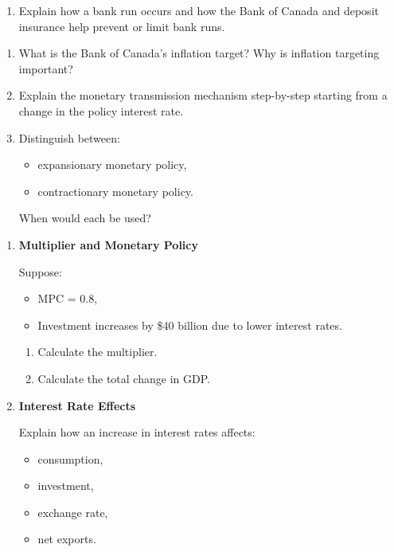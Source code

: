 \documentclass[12pt]{article}
\begin{document}
\begin{enumerate}[label=\textbf{\arabic*.}, start=6]

\item Explain how a bank run occurs and how the Bank of Canada and deposit insurance help prevent or limit bank runs.

\end{enumerate}


\vspace{1em}




\begin{enumerate}[label=\textbf{\arabic*.}, start=7]

\item What is the Bank of Canada’s inflation target? 
Why is inflation targeting important?

\item Explain the monetary transmission mechanism step-by-step starting from a change in the policy interest rate.

\item Distinguish between:
\begin{itemize}
    \item expansionary monetary policy,
    \item contractionary monetary policy.
\end{itemize}
When would each be used?

\end{enumerate}



\begin{enumerate}[label=\textbf{\arabic*.}, start=10]

\item \textbf{Multiplier and Monetary Policy}

Suppose:
\begin{itemize}
    \item MPC = 0.8,
    \item Investment increases by \$40 billion due to lower interest rates.
\end{itemize}

\begin{enumerate}
    \item[(a)] Calculate the multiplier.
    \item[(b)] Calculate the total change in GDP.
\end{enumerate}

\item \textbf{Interest Rate Effects}

Explain how an increase in interest rates affects:
\begin{itemize}
    \item consumption,
    \item investment,
    \item exchange rate,
    \item net exports.
\end{itemize}

\end{enumerate}
\end{document}
